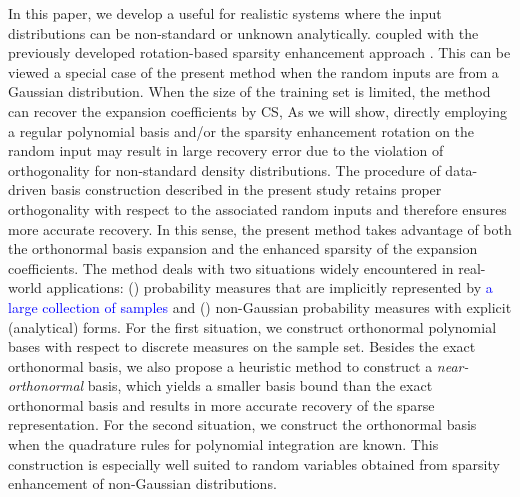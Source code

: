 In this paper, we develop a 
useful for realistic systems where the input distributions
can be non-standard or unknown analytically. 
coupled with the previously developed rotation-based sparsity enhancement approach \cite{Lei_Yang_MMS_2015}. This can be 
viewed a special case of the present method when the random inputs are from a Gaussian distribution. 
When the size of the training set is limited, the method can recover the 
expansion coefficients by \ac{CS}, 
%
As we will show, directly employing a regular polynomial basis and/or the sparsity enhancement rotation 
on the random input may result in large recovery error due to the violation of orthogonality for non-standard density distributions.
The procedure of data-driven basis construction described in the present study retains proper orthogonality 
with respect to the associated random inputs and therefore ensures more accurate recovery.
In this sense, the present method takes advantage of both the orthonormal basis expansion and the enhanced
sparsity of the expansion coefficients. 
{The method deals with two situations widely encountered in real-world applications: () probability measures 
  that are implicitly represented by \textcolor{blue}{a large collection of samples} and 
  () non-Gaussian probability measures with explicit (analytical) forms.
For the first situation, we construct
orthonormal polynomial bases with respect to discrete measures on the sample set. 
Besides the exact orthonormal basis, we also propose a heuristic method to 
construct a \emph{near-orthonormal} basis, which yields a smaller basis bound 
than the exact orthonormal basis and results in more accurate recovery of the 
sparse representation. For the second situation, we construct the orthonormal basis when
the quadrature rules for polynomial integration are known. This construction
is especially well suited to random variables obtained from sparsity enhancement of non-Gaussian distributions. 
}



